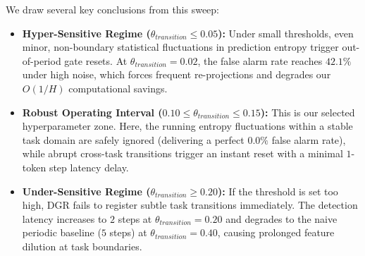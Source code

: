 \documentclass{article}
\theoremstyle{plain}
\theoremstyle{definition}
\theoremstyle{remark}
\begin{document}
We draw several key conclusions from this sweep:
\begin{itemize}
  \item \textbf{Hyper-Sensitive Regime ($\theta_{transition} \le 0.05$):} Under small thresholds, even minor, non-boundary statistical fluctuations in prediction entropy trigger out-of-period gate resets. At $\theta_{transition}=0.02$, the false alarm rate reaches $42.1\%$ under high noise, which forces frequent re-projections and degrades our $O(1/H)$ computational savings.
  \item \textbf{Robust Operating Interval ($0.10 \le \theta_{transition} \le 0.15$):} This is our selected hyperparameter zone. Here, the running entropy fluctuations within a stable task domain are safely ignored (delivering a perfect $0.0\%$ false alarm rate), while abrupt cross-task transitions trigger an instant reset with a minimal $1$-token step latency delay.
  \item \textbf{Under-Sensitive Regime ($\theta_{transition} \ge 0.20$):} If the threshold is set too high, DGR fails to register subtle task transitions immediately. The detection latency increases to $2$ steps at $\theta_{transition}=0.20$ and degrades to the naive periodic baseline ($5$ steps) at $\theta_{transition}=0.40$, causing prolonged feature dilution at task boundaries.
\end{itemize}
\end{document}
